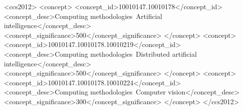 \documentclass[sigconf]{acmart}
\begin{document}
\begin{CCSXML}
<ccs2012>
   <concept>
       <concept_id>10010147.10010178</concept_id>
       <concept_desc>Computing methodologies~Artificial intelligence</concept_desc>
       <concept_significance>500</concept_significance>
       </concept>
   <concept>
       <concept_id>10010147.10010178.10010219</concept_id>
       <concept_desc>Computing methodologies~Distributed artificial intelligence</concept_desc>
       <concept_significance>500</concept_significance>
       </concept>
   <concept>
       <concept_id>10010147.10010178.10010224</concept_id>
       <concept_desc>Computing methodologies~Computer vision</concept_desc>
       <concept_significance>300</concept_significance>
       </concept>
 </ccs2012>
\end{CCSXML}







\maketitle












\end{document}

